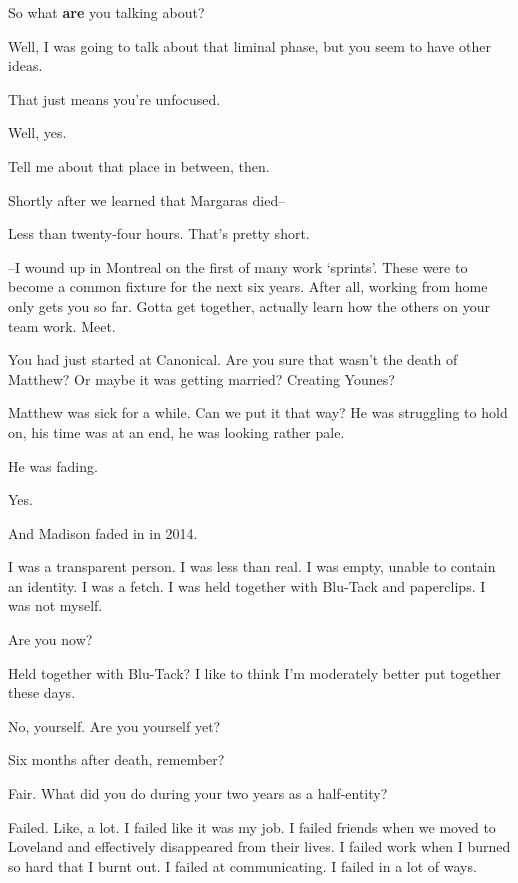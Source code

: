 \begin{paracol}{2}
\begin{leftcolumn}
\begin{ally}
So what \textbf{are} you talking about?
\end{ally}
Well, I was going to talk about that liminal phase, but you seem to have other ideas.

\begin{ally}
That just means you're unfocused.
\end{ally}
Well, yes.

\begin{ally}
Tell me about that place in between, then.
\end{ally}
\newpage

\noindent Shortly after we learned that Margaras died--

\begin{ally}
Less than twenty-four hours. That's pretty short.
\end{ally}
--I wound up in Montreal on the first of many work `sprints'. These were to become a common fixture for the next six years. After all, working from home only gets you so far. Gotta get together, actually learn how the others on your team work. Meet.

\begin{ally}
You had just started at Canonical. Are you sure that wasn't the death of Matthew? Or maybe it was getting married? Creating Younes?
\end{ally}
Matthew was sick for a while. Can we put it that way? He was struggling to hold on, his time was at an end, he was looking rather pale.

\begin{ally}
He was fading.
\end{ally}
Yes.

\begin{ally}
And Madison faded in in 2014.
\end{ally}
I was a transparent person. I was less than real. I was empty, unable to contain an identity. I was a fetch. I was held together with Blu-Tack and paperclips. I was not myself.

\begin{ally}
Are you now?
\end{ally}
Held together with Blu-Tack? I like to think I'm moderately better put together these days.

\begin{ally}
No, yourself. Are you yourself yet?
\end{ally}
Six months after death, remember?

\begin{ally}
Fair. What did you do during your two years as a half-entity?
\end{ally}
Failed. Like, a lot. I failed like it was my job. I failed friends when we moved to Loveland and effectively disappeared from their lives. I failed work when I burned so hard that I burnt out. I failed at communicating. I failed in a lot of ways.


\end{leftcolumn}
\end{paracol}
